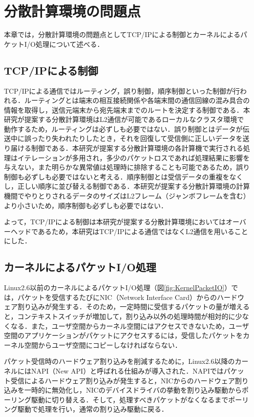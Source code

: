 \section{分散計算環境の問題点}
\label{sec:Problem}
本章では，分散計算環境の問題点としてTCP/IPによる制御とカーネルによるパケットI/O処理について述べる．

\subsection{TCP/IPによる制御}
TCP/IPによる通信ではルーティング，誤り制御，順序制御といった制御が行われる．ルーティングとは端末の相互接続関係や各端末間の通信回線の混み具合の情報を取得し，送信元端末から宛先端末までのルートを決定する制御である．本研究が提案する分散計算環境はL2通信が可能であるローカルなクラスタ環境で動作するため，ルーティングは必ずしも必要ではない．誤り制御とはデータが伝送中に誤ったり失われたりしたとき，それを回復して受信側に正しいデータを送り届ける制御である．本研究が提案する分散計算環境の各計算機で実行される処理はイテレーションが多用され，多少のパケットロスであれば処理結果に影響を与えない，また明らかな異常値は処理時に排除することも可能であるため，誤り制御も必ずしも必要ではないと考える．順序制御とは受信データの重複をなくし，正しい順序に並び替える制御である．本研究が提案する分散計算環境の計算機間でやりとりされるデータのサイズはL2フレーム（ジャンボフレームを含む）より小さいため，順序制御も必ずしも必要ではない．

よって，TCP/IPによる制御は本研究が提案する分散計算環境においてはオーバーヘッドであるため，本研究はTCP/IPによる通信ではなくL2通信を用いることにした．

\subsection{カーネルによるパケットI/O処理}
Linux2.6以前のカーネルによるパケットI/O処理（図\ref{fig:KernelPacketIO}）では，パケットを受信するたびにNIC（Network Interface Card）からのハードウェア割り込みが発生する．そのため，一定時間に受信するパケットの量が増えると，コンテキストスイッチが増加して，割り込み以外の処理時間が相対的に少なくなる．また，ユーザ空間からカーネル空間にはアクセスできないため，ユーザ空間のアプリケーションがパケットにアクセスするには，受信したパケットをカーネル空間からユーザ空間にコピーしなければならない．

パケット受信時のハードウェア割り込みを削減するために，Linux2.6以降のカーネルにはNAPI（New API）と呼ばれる仕組みが導入された．NAPIではパケット受信によるハードウェア割り込みが発生すると，NICからのハードウェア割り込みを一時的に無効化し，NICのデバイスドライバの挙動を割り込み駆動からポーリング駆動に切り替える．そして，処理すべきパケットがなくなるまでポーリング駆動で処理を行い，通常の割り込み駆動に戻る．


